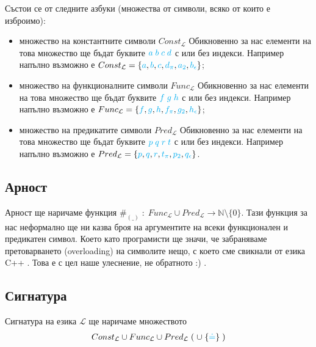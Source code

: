 \documentclass{article}[12pt]
\newcommand{\Lang}{\mathcal{L}}
\begin{document}
Състои се от следните азбуки (множества от символи, всяко от които е изброимо):

\begin{itemize}
\item множество на константните символи \(Const_\Lang\)
Обикновенно за нас елементи на това множество ще бъдат буквите \(\color{cyan} a \; b \; c \; d \) с или без индекси.
Например напълно възможно е \(Const_\Lang = \{\color{cyan} a \color{black}, \color{cyan} b \color{black} , \color{cyan} c \color{black} , \color{cyan} d_\pi \color{black} , \color{cyan} a_{2} \color{black} , \color{cyan} b_{\epsilon} \color{black} \}\);
\item множество на функционалните символи \(Func_\Lang\)
Обикновенно за нас елементи на това множество ще бъдат буквите \(\color{cyan} f \; g \; h \) с или без индекси.
Например напълно възможно е \(Func_\Lang = \{\color{cyan} f \color{black}, \color{cyan} g \color{black} , \color{cyan} h \color{black} , \color{cyan} f_\pi \color{black} , \color{cyan} g_{2} \color{black} , \color{cyan} h_{\epsilon} \color{black} \}\);
\item множество на предикатите символи \(Pred_\Lang\)
Обикновенно за нас елементи на това множество ще бъдат буквите \(\color{cyan} p \; q \; r \; t \) с или без индекси.
Например напълно възможно е \(Pred_\Lang = \{\color{cyan} p \color{black}, \color{cyan} q \color{black} , \color{cyan} r \color{black} , \color{cyan} t_\pi \color{black} , \color{cyan} p_{2} \color{black} , \color{cyan} q_{\epsilon} \color{black} \}\).
\end{itemize}

\subsection{Арност}

Арност ще наричаме функция \(\#_{(\_)} \; : \; Func_\Lang \cup Pred_\Lang \to \mathbb{N} \setminus \{0\} \).
Тази функция за нас неформално ще ни казва броя на аргументите на всеки функционален и предикатен символ.
Което като програмисти ще значи, че забраняваме претоварването (overloading) на символите нещо, с което сме свикнали от езика C++ .
Това е с цел наше улеснение, не обратното :) .

\subsection{Сигнатура}

Сигнатура на езика \(\Lang\) ще наричаме множеството
\begin{align*}
Const_\Lang \cup Func_\Lang \cup Pred_\Lang \; ( \; \cup \; \{ \color{cyan} \doteq  \color{black} \} \; )
\end{align*}
\end{document}
